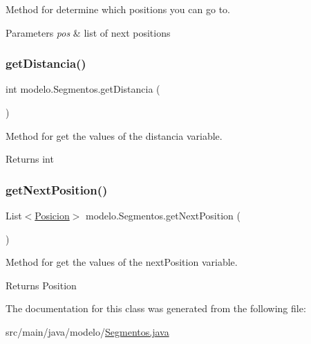 Method for determine which positions you can go to. 


\begin{DoxyParams}{Parameters}
{\em pos} & list of next positions \\
\hline
\end{DoxyParams}
\mbox{\label{classmodelo_1_1_segmentos_a3a0325af8cd98cdfe28294ed36012780}} 
\subsubsection{\texorpdfstring{get\+Distancia()}{getDistancia()}}
{\footnotesize\ttfamily int modelo.\+Segmentos.\+get\+Distancia (\begin{DoxyParamCaption}{ }\end{DoxyParamCaption})}



Method for get the values of the distancia variable. 

\begin{DoxyReturn}{Returns}
int 
\end{DoxyReturn}
\mbox{\label{classmodelo_1_1_segmentos_a33a1303cc99da1643d3bd7a897eca0cc}} 
\subsubsection{\texorpdfstring{get\+Next\+Position()}{getNextPosition()}}
{\footnotesize\ttfamily List$<$\mbox{\hyperlink{classmodelo_1_1_posicion}{Posicion}}$>$ modelo.\+Segmentos.\+get\+Next\+Position (\begin{DoxyParamCaption}{ }\end{DoxyParamCaption})}



Method for get the values of the next\+Position variable. 

\begin{DoxyReturn}{Returns}
Position 
\end{DoxyReturn}


The documentation for this class was generated from the following file\+:\begin{DoxyCompactItemize}
\item 
src/main/java/modelo/\mbox{\hyperlink{_segmentos_8java}{Segmentos.\+java}}\end{DoxyCompactItemize}
